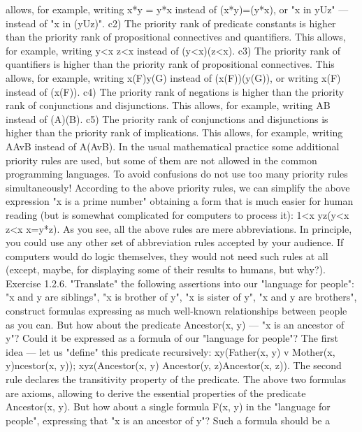 allows, for example, writing x*y = y*x instead of (x*y)=(y*x), or "x in yUz" --- instead of "x in (yUz)".
c2) The priority rank of predicate constants is higher than the priority rank of propositional connectives
and quantifiers. This allows, for example, writing y<x \AND  z<x instead of (y<x)\AND (z<x).
c3) The priority rank of quantifiers is higher than the priority rank of propositional connectives. This
allows, for example, writing \exists x(F)\AND \forall y(G) instead of (\exists x(F))\AND (\forall y(G)), or writing \neg \exists x(F) instead of
\neg (\exists x(F)).
c4) The priority rank of negations is higher than the priority rank of conjunctions and disjunctions. This
allows, for example, writing \neg A\AND \neg B instead of (\neg A)\AND (\neg B).
c5) The priority rank of conjunctions and disjunctions is higher than the priority rank of implications.
This allows, for example, writing A\IMPLIES AvB instead of A\IMPLIES (AvB).
In the usual mathematical practice some additional priority rules are used, but some of them are not
allowed in the common programming languages. To avoid confusions do not use too many priority rules
simultaneously!
According to the above priority rules, we can simplify the above expression "x is a prime number"
obtaining a form that is much easier for human reading (but is somewhat complicated for computers to
process it):
1<x \AND  \neg \exists y\exists z(y<x \AND  z<x \AND  x=y*z).
As you see, all the above rules are mere abbreviations. In principle, you could use any other set of
abbreviation rules accepted by your audience. If computers would do logic themselves, they would not
need such rules at all (except, maybe, for displaying some of their results to humans, but why?).
Exercise 1.2.6. "Translate" the following assertions into our "language for people":
"x and y are siblings",
"x is brother of y", "x is sister of y",
"x and y are brothers",
construct formulas expressing as much well-known relationships between people as you can.
But how about the predicate Ancestor(x, y) --- "x is an ancestor of y"? Could it be expressed as a formula
of our "language for people"? The first idea --- let us "define" this predicate recursively:
\forall x\forall y(Father(x, y) v Mother(x, y)\IMPLIES \forall ncestor(x, y));
\forall x\forall y\forall z(Ancestor(x, y) \AND  Ancestor(y, z)\IMPLIES Ancestor(x, z)).
The second rule declares the transitivity property of the predicate. The above two formulas are axioms,
allowing to derive the essential properties of the predicate Ancestor(x, y). But how about a single formula
F(x, y) in the "language for people", expressing that "x is an ancestor of y"? Such a formula should be a
